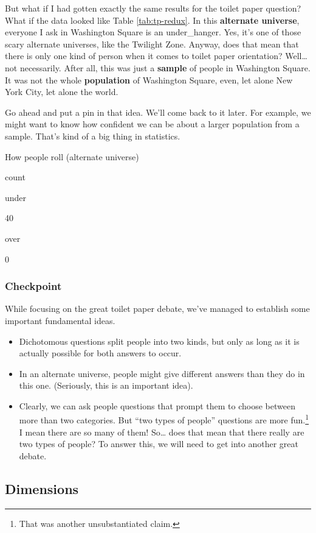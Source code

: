 \documentclass[]{book}
\let\rmarkdownfootnote\footnote%
\def\footnote{\protect\rmarkdownfootnote}
\begin{document}
But what if I had gotten exactly the same results for the toilet paper question? What if the data looked like Table \ref{tab:tp-redux}. In this \textbf{alternate universe}, everyone I ask in Washington Square is an under\_hanger. Yes, it's one of those scary alternate universes, like the Twilight Zone. Anyway, does that mean that there is only one kind of person when it comes to toilet paper orientation? Well\ldots{}not necessarily. After all, this was just a \textbf{sample} of people in Washington Square. It was not the whole \textbf{population} of Washington Square, even, let alone New York City, let alone the world.

Go ahead and put a pin in that idea. We'll come back to it later. For example, we might want to know how confident we can be about a larger population from a sample. That's kind of a big thing in statistics.

\label{tab:tp-redux}How people roll (alternate universe)

count

under

40

over

0

\hypertarget{checkpoint}{%
\subsubsection{Checkpoint}\label{checkpoint}}

While focusing on the great toilet paper debate, we've managed to establish some important fundamental ideas.

\begin{itemize}
\item
  Dichotomous questions split people into two kinds, but only as long as it is actually possible for both answers to occur.
\item
  In an alternate universe, people might give different answers than they do in this one. (Seriously, this is an important idea).
\item
  Clearly, we can ask people questions that prompt them to choose between more than two categories. But ``two types of people'' questions are more fun.\footnote{That was another unsubstantiated claim.} I mean there are so many of them! So\ldots{} does that mean that there really are two types of people? To answer this, we will need to get into another great debate.
\end{itemize}

\hypertarget{dimensions}{%
\subsection{Dimensions}\label{dimensions}}
\end{document}
